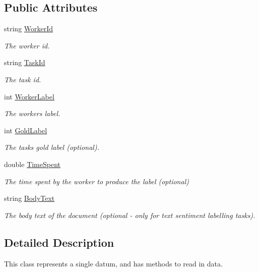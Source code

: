 \subsection*{Public Attributes}
\begin{DoxyCompactItemize}
\item 
string \hyperlink{class_crowdsourcing_models_1_1_datum_a0cd6c2a571200b43b79db48f2bcdb0f4}{Worker\+Id}
\begin{DoxyCompactList}\small\item\em The worker id. \end{DoxyCompactList}\item 
string \hyperlink{class_crowdsourcing_models_1_1_datum_a7368e7071cd2d6ff2458763e913cb53e}{Task\+Id}
\begin{DoxyCompactList}\small\item\em The task id. \end{DoxyCompactList}\item 
int \hyperlink{class_crowdsourcing_models_1_1_datum_a12f58ddc5efdea89aa99d2fbe944744f}{Worker\+Label}
\begin{DoxyCompactList}\small\item\em The worker\textquotesingle{}s label. \end{DoxyCompactList}\item 
int \hyperlink{class_crowdsourcing_models_1_1_datum_a236dd06bbd0ef1a2333b5524e0e22db4}{Gold\+Label}
\begin{DoxyCompactList}\small\item\em The task\textquotesingle{}s gold label (optional). \end{DoxyCompactList}\item 
double \hyperlink{class_crowdsourcing_models_1_1_datum_a86eda72a08cbb7ac25a4898cefc91161}{Time\+Spent}
\begin{DoxyCompactList}\small\item\em The time spent by the worker to produce the label (optional) \end{DoxyCompactList}\item 
string \hyperlink{class_crowdsourcing_models_1_1_datum_a38025a1cc896d8e6b9add41381e59db7}{Body\+Text}
\begin{DoxyCompactList}\small\item\em The body text of the document (optional -\/ only for text sentiment labelling tasks). \end{DoxyCompactList}\end{DoxyCompactItemize}


\subsection{Detailed Description}
This class represents a single datum, and has methods to read in data. 



